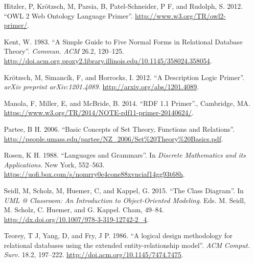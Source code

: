 \documentclass[]{article}
\begin{document}
\hypertarget{ref-hitzlerux5fowlux5f2012}{}
Hitzler, P, Krötzsch, M, Parsia, B, Patel-Schneider, P F, and Rudolph,
S. 2012. ``OWL 2 Web Ontology Language Primer''.
\url{http://www.w3.org/TR/owl2-primer/}.

\hypertarget{ref-kentux5fsimpleux5f1983}{}
Kent, W. 1983. ``A Simple Guide to Five Normal Forms in Relational
Database Theory''. \emph{Commun. ACM} 26.2, 120--125.
\url{http://doi.acm.org.proxy2.library.illinois.edu/10.1145/358024.358054}.

\hypertarget{ref-krotzschux5fdescriptionux5f2012}{}
Krötzsch, M, Simancík, F, and Horrocks, I. 2012. ``A Description Logic
Primer''. \emph{arXiv preprint arXiv:1201.4089}.
\url{http://arxiv.org/abs/1201.4089}.

\hypertarget{ref-manolaux5frdfux5f2014}{}
Manola, F, Miller, E, and McBride, B. 2014. ``RDF 1.1 Primer''.,
Cambridge, MA.
\url{https://www.w3.org/TR/2014/NOTE-rdf11-primer-20140624/}.

\hypertarget{ref-parteeux5fbasicux5f2006}{}
Partee, B H. 2006. ``Basic Concepts of Set Theory, Functions and
Relations''.
\url{http://people.umass.edu/partee/NZ_2006/Set\%20Theory\%20Basics.pdf}.

\hypertarget{ref-rosenux5flanguagesux5f1988}{}
Rosen, K H. 1988. ``Languages and Grammars''. In \emph{Discrete
Mathematics and its Applications}. New York, 552--563.
\url{https://uofi.box.com/s/nomrry0e4cone88xvnciaf14gg93t68h}.

\hypertarget{ref-seidlux5fclassux5f2015}{}
Seidl, M, Scholz, M, Huemer, C, and Kappel, G. 2015. ``The Class
Diagram''. In \emph{UML @ Classroom: An Introduction to Object-Oriented
Modeling}. Eds. M. Seidl, M. Scholz, C. Huemer, and G. Kappel. Cham,
49--84. \url{http://dx.doi.org/10.1007/978-3-319-12742-2_4}.

\hypertarget{ref-Teoreyux5f1986}{}
Teorey, T J, Yang, D, and Fry, J P. 1986. ``A logical design methodology
for relational databases using the extended entity-relationship model''.
\emph{ACM Comput. Surv.} 18.2, 197--222.
\url{http://doi.acm.org/10.1145/7474.7475}.
\end{document}
